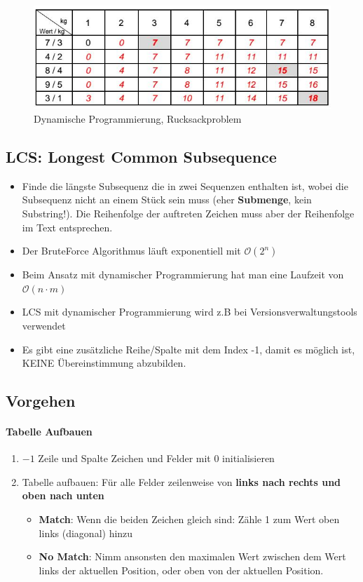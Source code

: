 \newpage

\begin{figure}[h]
\centering
\includegraphics[width=0.8\linewidth]{images/dynamische_prog}
\caption{Dynamische Programmierung, Rucksackproblem}
\label{fig:dynamischeprog}
\end{figure}

\subsection{LCS: Longest Common Subsequence}
\begin{itemize}
	\item Finde die längste Subsequenz die in zwei Sequenzen enthalten ist, wobei die Subsequenz nicht an einem Stück sein muss (eher \textbf{Submenge}, kein Substring!). Die Reihenfolge der auftreten Zeichen muss aber der Reihenfolge im Text entsprechen.
	\item Der BruteForce Algorithmus läuft exponentiell mit $\mathcal{O}(2^n)$
	\item Beim Ansatz mit dynamischer Programmierung hat man eine Laufzeit von $\mathcal{O}(n \cdot m)$
	\item LCS mit dynamischer Programmierung wird z.B bei Versionsverwaltungstools verwendet
	\item Es gibt eine zusätzliche Reihe/Spalte mit dem Index -1, damit es möglich ist, KEINE Übereinstimmung abzubilden.
\end{itemize}

\clearpage

\subsection{Vorgehen}
\paragraph{Tabelle Aufbauen}
\begin{enumerate}
	\item $-1$ Zeile und Spalte Zeichen und Felder mit 0 initialisieren
	\item Tabelle aufbauen: Für alle Felder zeilenweise von \textbf{links nach rechts und oben nach unten}
	\begin{itemize}
		\item \textbf{Match}: Wenn die beiden Zeichen gleich sind: Zähle 1 zum Wert oben links (diagonal) hinzu
		\item \textbf{No Match}: Nimm ansonsten den maximalen Wert zwischen dem Wert links der aktuellen Position, oder oben von der aktuellen Position.
	\end{itemize}
\end{enumerate}

